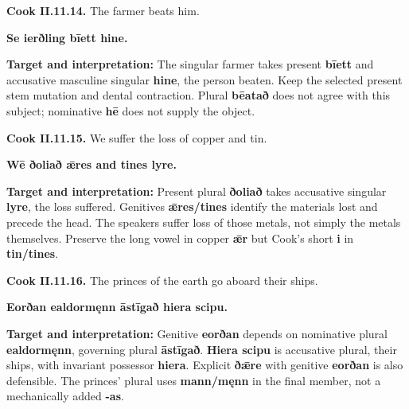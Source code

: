\par\begin{minipage}{\linewidth}\raggedright
\textbf{Cook II.11.14.} The farmer beats him.

\textbf{Se ierðling bīett hine.}

\textbf{Target and interpretation:} The singular farmer takes present \textbf{bīett} and accusative masculine singular \textbf{hine}, the person beaten. Keep the selected present stem mutation and dental contraction. Plural \textbf{bēatað} does not agree with this subject; nominative \textbf{hē} does not supply the object.

\end{minipage}\par\addvspace{4pt}

\par\begin{minipage}{\linewidth}\raggedright
\textbf{Cook II.11.15.} We suffer the loss of copper and tin.

\textbf{Wē ðoliað ǣres and tines lyre.}

\textbf{Target and interpretation:} Present plural \textbf{ðoliað} takes accusative singular \textbf{lyre}, the loss suffered. Genitives \textbf{ǣres/\allowbreak{}tines} identify the materials lost and precede the head. The speakers suffer loss of those metals, not simply the metals themselves. Preserve the long vowel in copper \textbf{ǣr} but Cook's short \textbf{i} in \textbf{tin/\allowbreak{}tines}.

\end{minipage}\par\addvspace{4pt}

\par\begin{minipage}{\linewidth}\raggedright
\textbf{Cook II.11.16.} The princes of the earth go aboard their ships.

\textbf{Eorðan ealdormęnn āstīgað hiera scipu.}

\textbf{Target and interpretation:} Genitive \textbf{eorðan} depends on nominative plural \textbf{ealdormęnn}, governing plural \textbf{āstīgað}. \textbf{Hiera scipu} is accusative plural, their ships, with invariant possessor \textbf{hiera}. Explicit \textbf{ðǣre} with genitive \textbf{eorðan} is also defensible. The princes' plural uses \textbf{mann/\allowbreak{}męnn} in the final member, not a mechanically added \textbf{-as}.

\end{minipage}\par\addvspace{4pt}

